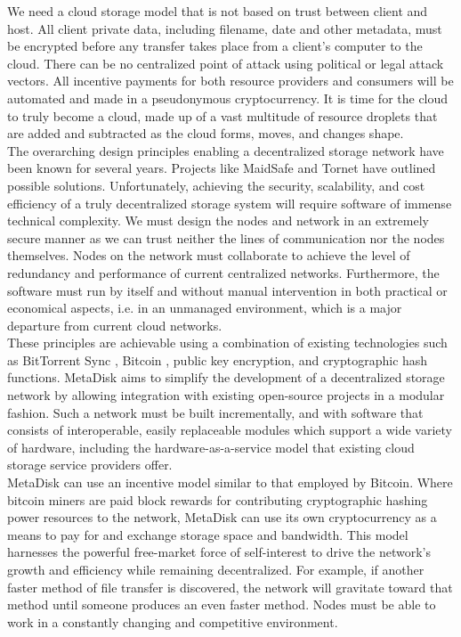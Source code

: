 \documentclass[a4paper,10pt]{article}
\begin{document}
We need a cloud storage model that is not based on trust between client and host.  All client private data, including filename, date and other metadata, must be encrypted before any transfer takes place from a client’s computer to the cloud.  There can be no centralized point of attack using political or legal attack vectors.  All incentive payments for both resource providers and consumers will be automated and made in a pseudonymous cryptocurrency.  It is time for the cloud to truly become a cloud, made up of a vast multitude of resource droplets that are added and subtracted as the cloud forms, moves, and changes shape.\\

The overarching design principles enabling a decentralized storage network have been known for several years. Projects like MaidSafe \cite{1} and Tornet \cite{2} have outlined possible solutions. Unfortunately, achieving the security, scalability, and cost efficiency of a truly decentralized storage system will require software of immense technical complexity.  We must design the nodes and network in an extremely secure manner as we can trust neither the lines of communication nor the nodes themselves. Nodes on the network must collaborate to achieve the level of redundancy and performance of current centralized networks.  Furthermore, the software must run by itself and without manual intervention in both practical or economical aspects, i.e. in an unmanaged environment, which is a major departure from current cloud networks.      \\

These principles are achievable using a combination of existing technologies such as BitTorrent Sync \cite{3}, Bitcoin \cite{4}, public key encryption, and cryptographic hash functions.  MetaDisk aims to simplify the development of a decentralized storage network by allowing integration with existing open-source projects in a modular fashion.  Such a network must be built incrementally, and with software that consists of interoperable, easily replaceable modules which support a wide variety of hardware, including the hardware-as-a-service model that existing cloud storage service providers offer. \\

MetaDisk can use an incentive model similar to that employed by Bitcoin. Where bitcoin miners are paid block rewards for contributing cryptographic hashing power resources to the network, MetaDisk can use its own cryptocurrency as a means to pay for and exchange storage space and bandwidth. This model harnesses the powerful free-market force of self-interest to drive the network’s growth and efficiency while remaining decentralized.  For example, if another faster method of file transfer is discovered, the network will gravitate toward that method until someone produces an even faster method. Nodes must be able to work in a constantly changing and competitive environment. 
\end{document}
